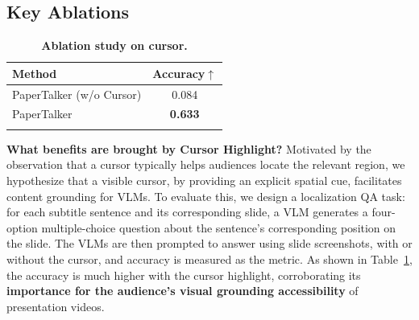 \subsection{Key Ablations}
\vspace{-0.4\baselineskip} 
\begin{table} %
  \vspace{-2\baselineskip}               %
  \tablesize
  \centering
    \caption{\textbf{Ablation study on cursor.}}
  \begin{tabular}{lc}
    \toprule
    Method & Accuracy$\uparrow$ \\
    \midrule
    PaperTalker (w/o Cursor) &  0.084 \\
    PaperTalker &\textbf{0.633} \\
    \bottomrule
    \label{table:cursor}
  \end{tabular}
\end{table}
\noindent\textbf{What benefits are brought by Cursor Highlight?} 
Motivated by the observation that a cursor typically helps audiences locate the relevant region, we hypothesize that a visible cursor, by providing an explicit spatial cue, facilitates content grounding for VLMs. To evaluate this, we design a localization QA task: for each subtitle sentence and its corresponding slide, a VLM generates a four-option multiple-choice question about the sentence’s corresponding position on the slide. The VLMs are then prompted to answer using slide screenshots, with or without the cursor, and accuracy is measured as the metric. As shown in Table~\ref{table:cursor}, the accuracy is much higher with the cursor highlight, corroborating its \textbf{importance for the audience's visual grounding accessibility} of presentation videos. 

